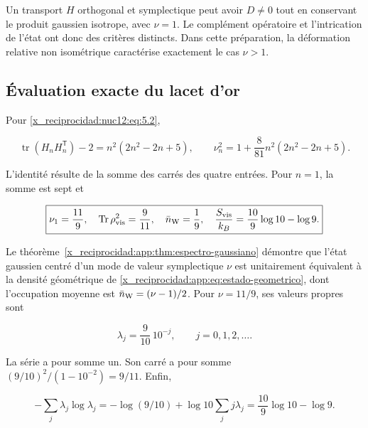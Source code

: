 Un transport \(H\) orthogonal et symplectique peut avoir \(D\neq0\) tout en conservant le produit gaussien isotrope, avec \(\nu=1\). Le complément opératoire et l’intrication de l’état ont donc des critères distincts. Dans cette préparation, la déformation relative non isométrique caractérise exactement le cas \(\nu>1\).

\subsection{Évaluation exacte du lacet d’or}

Pour \eqref{x_reciprocidad:nuc12:eq:5.2},



\begin{equation}
\operatorname{tr}(H_nH_n^{\mathsf T})-2
=n^2(2n^2-2n+5),\qquad
\nu_n^2=1+\frac8{81}n^2(2n^2-2n+5).
\label{x_reciprocidad:nuc12:eq:5.8}
\end{equation}



L’identité résulte de la somme des carrés des quatre entrées. Pour \(n=1\), la somme est sept et



\begin{equation}
\boxed{\nu_1=\frac{11}{9},\quad
\operatorname{Tr}\rho_{\rm vis}^2=\frac9{11},\quad
\bar n_{\rm W}=\frac19,\quad
\frac{S_{\rm vis}}{k_B}=\frac{10}{9}\log10-\log9.}
\label{x_reciprocidad:nuc12:eq:5.9}
\end{equation}



Le théorème~\ref{x_reciprocidad:app:thm:espectro-gaussiano} démontre que l’état gaussien centré d’un mode de valeur symplectique \(\nu\) est unitairement équivalent à la densité géométrique de \eqref{x_reciprocidad:app:eq:estado-geometrico}, dont l’occupation moyenne est \(\bar n_{\rm W}=(\nu-1)/2\). Pour \(\nu=11/9\), ses valeurs propres sont



\begin{equation}
\lambda_j=\frac9{10}\,10^{-j},\qquad j=0,1,2,\ldots.
\label{x_reciprocidad:nuc12:eq:5.10}
\end{equation}



La série a pour somme un. Son carré a pour somme
\((9/10)^2/(1-10^{-2})=9/11\). Enfin,


\[
-\sum_j\lambda_j\log\lambda_j
=-\log(9/10)+\log10\sum_jj\lambda_j
=\frac{10}{9}\log10-\log9.
\]



